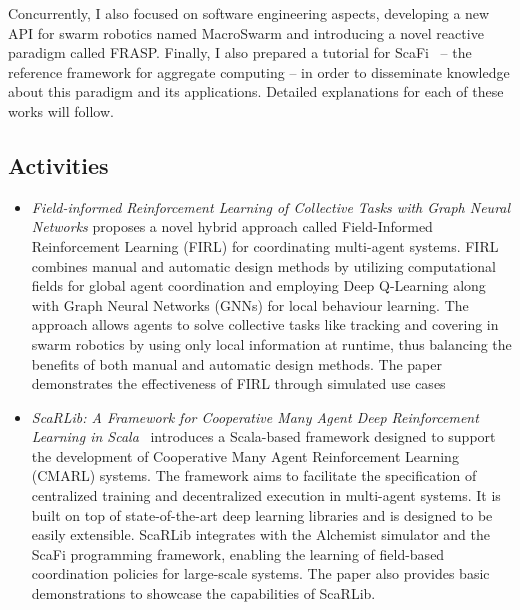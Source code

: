 \documentclass[11pt]{article}
\begin{document}
Concurrently, 
 I also focused on software engineering aspects, 
 developing a new API for swarm robotics named MacroSwarm and introducing a novel reactive paradigm called FRASP. 
Finally, I also prepared a tutorial for ScaFi~\cite{scafi} -- the reference framework for aggregate computing -- in order to disseminate knowledge about this paradigm and its applications.
 Detailed explanations for each of these works will follow.
\subsection{Activities}
\begin{itemize}
	\item
	\textit{Field-informed Reinforcement Learning of Collective Tasks with Graph Neural Networks} proposes a novel hybrid approach called Field-Informed Reinforcement Learning (FIRL) for coordinating multi-agent systems. 
	FIRL combines manual and automatic design methods by utilizing computational fields for global agent coordination and employing Deep Q-Learning along with Graph Neural Networks (GNNs) for local behaviour learning. 
	The approach allows agents to solve collective tasks like tracking and covering in swarm robotics by using only local information at runtime, thus balancing the benefits of both manual and automatic design methods. 
	The paper demonstrates the effectiveness of FIRL through simulated use cases

\item \textit{ScaRLib: A Framework for Cooperative Many Agent Deep Reinforcement Learning in Scala}~\cite{scarlib} introduces a Scala-based framework designed to support the development of Cooperative Many Agent Reinforcement Learning (CMARL) systems. 
The framework aims to facilitate the specification of centralized training and decentralized execution in multi-agent systems. 
It is built on top of state-of-the-art deep learning libraries and is designed to be easily extensible. 
ScaRLib integrates with the Alchemist simulator and the ScaFi programming framework, enabling the learning of field-based coordination policies for large-scale systems. 
The paper also provides basic demonstrations to showcase the capabilities of ScaRLib. 
 

\end{itemize}
\end{document}
